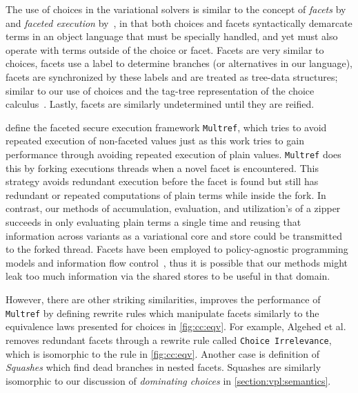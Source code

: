 The use of choices in the variational solvers is similar to the concept of
\textit{facets} by~\cite{austin2012multiple} and \textit{faceted execution}
by~\cite{Schmitz2018FacetedSM,Micinski2018AbstractingFE,10.1145/2465106.2465121},
in that both choices and facets syntactically demarcate terms in an object
language that must be specially handled, and yet must also operate with terms
outside of the choice or facet. Facets are very similar to choices, facets use a
label to determine branches (or alternatives in our language), facets are
synchronized by these labels and are treated as tree-data structures; similar to
our use of choices and the tag-tree representation of the choice
calculus~\cite{Walk13thesis}. Lastly, facets are similarly undetermined until
they are reified.

\citet{10.1145/3243734.3243806} define the faceted secure execution framework
\texttt{Multref}, which tries to avoid repeated execution of non-faceted values
just as this work tries to gain performance through avoiding repeated execution
of plain values. \texttt{Multref} does this by forking executions threads when a
novel facet is encountered. This strategy avoids redundant execution before the
facet is found but still has redundant or repeated computations of plain terms
while inside the fork. In contrast, our methods of accumulation, evaluation, and
utilization's of a zipper succeeds in only evaluating plain terms a single time
and reusing that information across variants as a variational core and store
could be transmitted to the forked thread. Facets have been employed to
policy-agnostic programming models and information flow control~\cite{IFC}, thus
it is possible that our methods might leak too much information via the shared
stores to be useful in that domain.

However, there are other striking similarities, \citet{optimisingFacets}
improves the performance of \texttt{Multref} by defining rewrite rules which
manipulate facets similarly to the equivalence laws presented for choices in
\autoref{fig:cc:eqv}. For example, Algehed et al. removes redundant facets
through a rewrite rule called \texttt{Choice Irrelevance}, which is isomorphic
to the  rule in \autoref{fig:cc:eqv}. Another case is definition of
\emph{Squashes} which find dead branches in nested facets. Squashes are
similarly isomorphic to our discussion of \emph{dominating choices} in
\autoref{section:vpl:semantics}.




